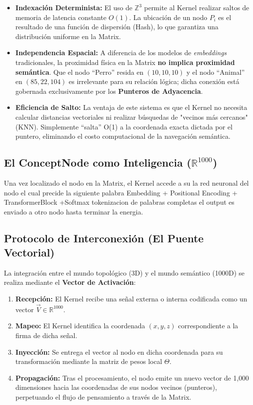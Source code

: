 \documentclass[12pt]{article}
\begin{document}
\begin{itemize}
	\item \textbf{Indexación Determinista:} El uso de $\mathbb{Z}^3$ permite al Kernel realizar saltos de memoria de latencia constante $O(1)$. La ubicación de un nodo $P_i$ es el resultado de una función de dispersión (Hash), lo que garantiza una distribución uniforme en la Matrix.
	\item \textbf{Independencia Espacial:} A diferencia de los modelos de \textit{embeddings} tradicionales, la proximidad física en la Matrix \textbf{no implica proximidad semántica}. Que el nodo ``Perro'' resida en $(10, 10, 10)$ y el nodo ``Animal'' en $(85, 22, 104)$ es irrelevante para su relación lógica; dicha conexión está gobernada exclusivamente por los \textbf{Punteros de Adyacencia}.
	\item \textbf{Eficiencia de Salto:} La ventaja de este sistema es que el Kernel no necesita calcular distancias vectoriales ni realizar búsquedas de "vecinos más cercanos" (KNN). Simplemente ``salta''  O(1) a la coordenada exacta dictada por el puntero, eliminando el costo computacional de la navegación semántica.
\end{itemize}



\subsection{El ConceptNode como Inteligencia ($\mathbb{R}^{1000}$)}
Una vez localizado el nodo en la Matrix, el Kernel accede a su la red neuronal del nodo
el cual precide la siguiente palabra Embedding + Positional Encoding + TransformerBlock +Softmax  tokenizacion de palabras completas
el output es enviado a otro nodo hasta terminar la energia.

\subsection{Protocolo de Interconexión (El Puente Vectorial)}
La integración entre el mundo topológico (3D) y el mundo semántico (1000D) se realiza mediante el \textbf{Vector de Activación}:

\begin{enumerate}
	\item \textbf{Recepción:} El Kernel recibe una señal externa o interna codificada como un vector $\vec{V} \in \mathbb{R}^{1000}$.
	\item \textbf{Mapeo:} El Kernel identifica la coordenada $(x, y, z)$ correspondiente a la firma de dicha señal.
	\item \textbf{Inyección:} Se entrega el vector al nodo en dicha coordenada para su transformación mediante la matriz de pesos local $\Theta$.
	\item \textbf{Propagación:} Tras el procesamiento, el nodo emite un nuevo vector de 1,000 dimensiones hacia las coordenadas de sus nodos vecinos (punteros), perpetuando el flujo de pensamiento a través de la Matrix.
\end{enumerate}
\end{document}
